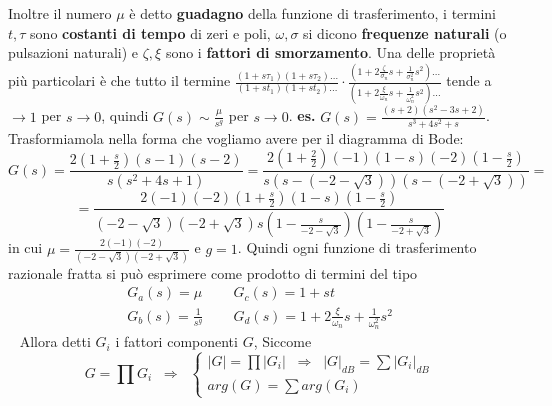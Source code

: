 Inoltre il numero $\mu$ è detto \textbf{guadagno} della funzione di trasferimento, i termini $t, \tau$ sono \textbf{costanti di tempo} di zeri e poli,  $\omega, \sigma$ si dicono \textbf{frequenze naturali} (o pulsazioni naturali) e $\zeta, \xi$ sono i \textbf{fattori di smorzamento}.\newline
\newline
Una delle proprietà più particolari è che tutto il termine $\frac{(1 + s \tau_1)(1 + s \tau_2)\dots}{(1 + s t_1)(1 + s t_2)\dots} \cdot \frac{(1 + 2 \frac{\zeta}{\sigma_n}s + \frac{1}{\sigma_n^2}s^2)\dots}{(1 + 2 \frac{\xi}{\omega_n} s + \frac{1}{\omega_n^2}s^2)\dots}$ tende a $\rightarrow  1$ per $s \rightarrow 0$, quindi $G(s) \sim \frac{\mu}{s^g}$ per $s \rightarrow  0$.\newline
\newline
\textbf{es.} $G(s) = \frac{(s+2)(s^2-3s+2)}{s^3 + 4 s^2 + s}$.\newline
Trasformiamola nella forma che vogliamo avere per il diagramma di Bode:
\[
    G(s) = \frac{2(1+\frac{s}{2})(s-1)(s-2)}{s(s^2+4s+1)} = \frac{2(1+ \frac{2}{2})(-1)(1-s)(-2)(1-\frac{s}{2})}{s(s-(-2-\sqrt{3}))(s-(-2+\sqrt{3}))}=
\]
\[
    = \frac{2(-1)(-2)(1+\frac{s}{2})(1-s)(1-\frac{s}{2})}{(-2-\sqrt{3})(-2+\sqrt{3})s(1-\frac{s}{-2-\sqrt{3}})(1-\frac{s}{-2+\sqrt{3}})}
\]
in cui $\mu= \frac{2(-1)(-2)}{(-2-\sqrt{3})(-2+\sqrt{3})}$ e $g=1$.\newline
\newline
\newline
Quindi ogni funzione di trasferimento razionale fratta si può esprimere come prodotto di termini del tipo 
\[
    \begin{matrix}
        G_a(s) = \mu & \;\; & G_c(s) = 1+ s t\\
        G_b(s) = \frac{1}{s^g} & \;\; & G_d(s) = 1 + 2 \frac{\xi}{\omega_n}s + \frac{1}{\omega_n^2}s^2
    \end{matrix}
\]
\ \newline
\newline
Allora detti $G_i$ i fattori componenti $G$, Siccome
\[
    G=\prod G_i \;\; \Longrightarrow \;\; \begin{cases}
        |G| = \prod |G_i| \;\; \Longrightarrow \;\; |G|_{dB} = \sum |G_i|_{dB}\\
        arg(G) = \sum arg(G_i)
    \end{cases}
\]

